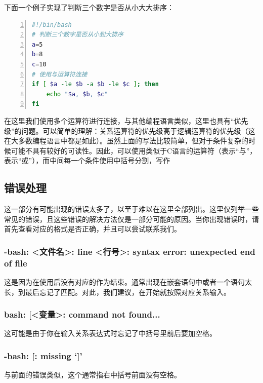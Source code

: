 下面一个例子实现了判断三个数字是否从小大大排序：

\begin{lstlisting}[language=bash,caption=sort,numbers=left]
#!/bin/bash
# 判断三个数字是否从小到大排序
a=5
b=8
c=10
# 使用与运算符连接
if [ $a -le $b -a $b -le $c ]; then
	echo "$a, $b, $c"
fi
\end{lstlisting}

\begin{extend}
    在这里我们使用多个运算符进行连接，与其他编程语言类似，这里也具有“优先级”的问题。可以简单的理解：关系运算符的优先级高于逻辑运算符的优先级（这在大多数编程语言中都是如此）。虽然上面的写法比较简单，但对于条件复杂的时候可能不具有较好的可读性。因此，可以使用类似于C语言的运算符（\code{\&\&}表示“与”，\code{||}表示“或”），而中间每一个条件使用中括号分割，写作
\end{extend}


\subsection{错误处理}\label{subsec:节标题-错误处理}

这一部分有可能出现的错误太多了，以至于难以在这里全部列出。这里仅列举一些常见的错误，且这些错误的解决方法仅是一部分可能的原因。当你出现错误时，请首先查看对应的格式是否正确，并且可以尝试联系我们。

\subsubsection{-bash: <文件名>: line <行号>: syntax error: unexpected end of file}

这是因为在使用后没有对应的作为结束。通常出现在嵌套语句中或者一个语句太长，到最后忘记了匹配。对此，我们建议，在开始就按照对应关系输入。

\subsubsection{bash: [<变量>: command not found...}

这可能是由于你在输入关系表达式时忘记了中括号里前后要加空格。

\subsubsection{-bash: [: missing `]'}
与前面的错误类似，这个通常指右中括号前面没有空格。
